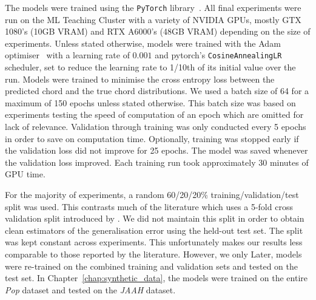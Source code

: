 The models were trained using the \texttt{PyTorch} library~\citep{pytorch}. All final experiments were run on the ML Teaching Cluster with a variety of NVIDIA GPUs, mostly GTX 1080's (10GB VRAM) and RTX A6000's (48GB VRAM) depending on the size of experiments. Unless stated otherwise, models were trained with the Adam optimiser~\citep{adam} with a learning rate of $0.001$ and pytorch's \texttt{CosineAnnealingLR} scheduler, set to reduce the learning rate to 1/10th of its initial value over the run. Models were trained to minimise the cross entropy loss between the predicted chord and the true chord distributions. We used a batch size of 64 for a maximum of 150 epochs unless stated otherwise. This batch size was based on experiments testing the speed of computation of an epoch which are omitted for lack of relevance. Validation through training was only conducted every 5 epochs in order to save on computation time. Optionally, training was stopped early if the validation loss did not improve for 25 epochs. The model was saved whenever the validation loss improved. Each training run took approximately 30 minutes of GPU time. 

For the majority of experiments, a random 60/20/20\% training/validation/test split was used. This contrasts much of the literature which uses a 5-fold cross validation split introduced by \citet{FourTimelyInsights}. We did not maintain this split in order to obtain clean estimators of the generalisation error using the held-out test set. The split was kept constant across experiments. This unfortunately makes our results less comparable to those reported by the literature. However, we only  Later, models were re-trained on the combined training and validation sets and tested on the test set. In Chapter~\ref{chap:synthetic_data}, the models were trained on the entire \emph{Pop} dataset and tested on the \emph{JAAH} dataset.